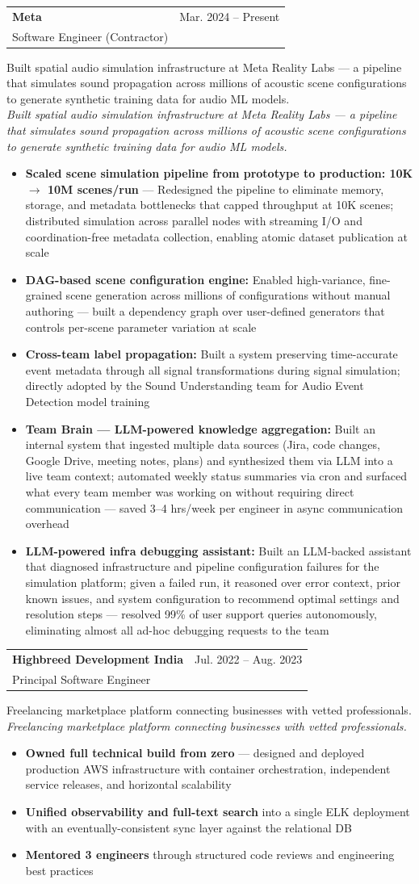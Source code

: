 \documentclass[letterpaper,10pt]{article}
\makeatletter
\newcommand{\resumeItem}[1]{
  \item\small{
    {#1 \vspace{-2pt}}
  }
}
\newcommand{\resumeSubheading}[5]{
  \vspace{-2pt}\item
    \begin{tabular*}{0.97\textwidth}[t]{l@{\extracolsep{\fill}}r}
      \textbf{#1} & #2 \\
      {\small#3} & {\small #4} \\
    \end{tabular*}
    \ifx\relax#5\relax\else\\\small\textit{#5}\fi\vspace{-5pt}
}
\newcommand{\resumeItemListStart}{\begin{itemize}[itemsep=4pt, parsep=0pt]}
\newcommand{\resumeItemListEnd}{\end{itemize}\vspace{-5pt}}
\makeatother
\begin{document}
    \resumeSubheading
    {Meta}{Mar. 2024 -- Present}
    {Software Engineer (Contractor)}{}
      {Built spatial audio simulation infrastructure at Meta Reality Labs --- a pipeline that simulates sound propagation across millions of acoustic scene configurations to generate synthetic training data for audio ML models.}
      \resumeItemListStart
        \resumeItem{\textbf{Scaled scene simulation pipeline from prototype to production: 10K $\rightarrow$ 10M scenes/run} --- Redesigned the pipeline to eliminate memory, storage, and metadata bottlenecks that capped throughput at 10K scenes; distributed simulation across parallel nodes with streaming I/O and coordination-free metadata collection, enabling atomic dataset publication at scale}
        \resumeItem{\textbf{DAG-based scene configuration engine:} Enabled high-variance, fine-grained scene generation across millions of configurations without manual authoring --- built a dependency graph over user-defined generators that controls per-scene parameter variation at scale}
        \resumeItem{\textbf{Cross-team label propagation:} Built a system preserving time-accurate event metadata through all signal transformations during signal simulation; directly adopted by the Sound Understanding team for Audio Event Detection model training}
        \resumeItem{\textbf{Team Brain --- LLM-powered knowledge aggregation:} Built an internal system that ingested multiple data sources (Jira, code changes, Google Drive, meeting notes, plans) and synthesized them via LLM into a live team context; automated weekly status summaries via cron and surfaced what every team member was working on without requiring direct communication --- saved 3--4 hrs/week per engineer in async communication overhead}
        \resumeItem{\textbf{LLM-powered infra debugging assistant:} Built an LLM-backed assistant that diagnosed infrastructure and pipeline configuration failures for the simulation platform; given a failed run, it reasoned over error context, prior known issues, and system configuration to recommend optimal settings and resolution steps --- resolved 99\% of user support queries autonomously, eliminating almost all ad-hoc debugging requests to the team}
      \resumeItemListEnd

    \resumeSubheading
      {Highbreed Development India}{Jul. 2022 -- Aug. 2023}
      {Principal Software Engineer}{}
      {Freelancing marketplace platform connecting businesses with vetted professionals.}
      \resumeItemListStart
        \resumeItem{\textbf{Owned full technical build from zero} --- designed and deployed production AWS infrastructure with container orchestration, independent service releases, and horizontal scalability}
        \resumeItem{\textbf{Unified observability and full-text search} into a single ELK deployment with an eventually-consistent sync layer against the relational DB}
        \resumeItem{\textbf{Mentored 3 engineers} through structured code reviews and engineering best practices}
      \resumeItemListEnd
\end{document}
